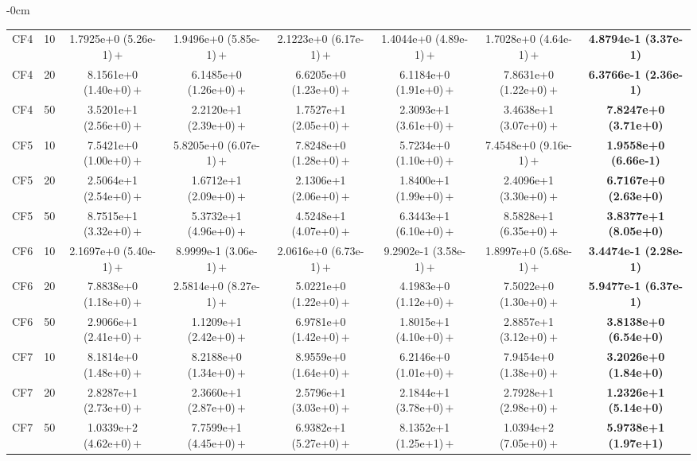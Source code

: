 \begin{table}[!htbp]
\begin{ROneBlock}
\begin{adjustwidth}{-\extralength}{0cm}
\begin{tabular*}{\linewidth}{@{\extracolsep{\fill}}llcccccc@{}}
CF4 & 10 & 1.7925e+0 (5.26e-1)\,$+$ & 1.9496e+0 (5.85e-1)\,$+$ & 2.1223e+0 (6.17e-1)\,$+$ & 1.4044e+0 (4.89e-1)\,$+$ & 1.7028e+0 (4.64e-1)\,$+$ & \textbf{4.8794e-1 (3.37e-1)} \\
CF4 & 20 & 8.1561e+0 (1.40e+0)\,$+$ & 6.1485e+0 (1.26e+0)\,$+$ & 6.6205e+0 (1.23e+0)\,$+$ & 6.1184e+0 (1.91e+0)\,$+$ & 7.8631e+0 (1.22e+0)\,$+$ & \textbf{6.3766e-1 (2.36e-1)} \\
CF4 & 50 & 3.5201e+1 (2.56e+0)\,$+$ & 2.2120e+1 (2.39e+0)\,$+$ & 1.7527e+1 (2.05e+0)\,$+$ & 2.3093e+1 (3.61e+0)\,$+$ & 3.4638e+1 (3.07e+0)\,$+$ & \textbf{7.8247e+0 (3.71e+0)} \\
CF5 & 10 & 7.5421e+0 (1.00e+0)\,$+$ & 5.8205e+0 (6.07e-1)\,$+$ & 7.8248e+0 (1.28e+0)\,$+$ & 5.7234e+0 (1.10e+0)\,$+$ & 7.4548e+0 (9.16e-1)\,$+$ & \textbf{1.9558e+0 (6.66e-1)} \\
CF5 & 20 & 2.5064e+1 (2.54e+0)\,$+$ & 1.6712e+1 (2.09e+0)\,$+$ & 2.1306e+1 (2.06e+0)\,$+$ & 1.8400e+1 (1.99e+0)\,$+$ & 2.4096e+1 (3.30e+0)\,$+$ & \textbf{6.7167e+0 (2.63e+0)} \\
CF5 & 50 & 8.7515e+1 (3.32e+0)\,$+$ & 5.3732e+1 (4.96e+0)\,$+$ & 4.5248e+1 (4.07e+0)\,$+$ & 6.3443e+1 (6.10e+0)\,$+$ & 8.5828e+1 (6.35e+0)\,$+$ & \textbf{3.8377e+1 (8.05e+0)} \\
CF6 & 10 & 2.1697e+0 (5.40e-1)\,$+$ & 8.9999e-1 (3.06e-1)\,$+$ & 2.0616e+0 (6.73e-1)\,$+$ & 9.2902e-1 (3.58e-1)\,$+$ & 1.8997e+0 (5.68e-1)\,$+$ & \textbf{3.4474e-1 (2.28e-1)} \\
CF6 & 20 & 7.8838e+0 (1.18e+0)\,$+$ & 2.5814e+0 (8.27e-1)\,$+$ & 5.0221e+0 (1.22e+0)\,$+$ & 4.1983e+0 (1.12e+0)\,$+$ & 7.5022e+0 (1.30e+0)\,$+$ & \textbf{5.9477e-1 (6.37e-1)} \\
CF6 & 50 & 2.9066e+1 (2.41e+0)\,$+$ & 1.1209e+1 (2.42e+0)\,$+$ & 6.9781e+0 (1.42e+0)\,$+$ & 1.8015e+1 (4.10e+0)\,$+$ & 2.8857e+1 (3.12e+0)\,$+$ & \textbf{3.8138e+0 (6.54e+0)} \\
CF7 & 10 & 8.1814e+0 (1.48e+0)\,$+$ & 8.2188e+0 (1.34e+0)\,$+$ & 8.9559e+0 (1.64e+0)\,$+$ & 6.2146e+0 (1.01e+0)\,$+$ & 7.9454e+0 (1.38e+0)\,$+$ & \textbf{3.2026e+0 (1.84e+0)} \\
CF7 & 20 & 2.8287e+1 (2.73e+0)\,$+$ & 2.3660e+1 (2.87e+0)\,$+$ & 2.5796e+1 (3.03e+0)\,$+$ & 2.1844e+1 (3.78e+0)\,$+$ & 2.7928e+1 (2.98e+0)\,$+$ & \textbf{1.2326e+1 (5.14e+0)} \\
CF7 & 50 & 1.0339e+2 (4.62e+0)\,$+$ & 7.7599e+1 (4.45e+0)\,$+$ & 6.9382e+1 (5.27e+0)\,$+$ & 8.1352e+1 (1.25e+1)\,$+$ & 1.0394e+2 (7.05e+0)\,$+$ & \textbf{5.9738e+1 (1.97e+1)} \\

\end{tabular*}
\end{adjustwidth}
\end{ROneBlock}
\end{table}
